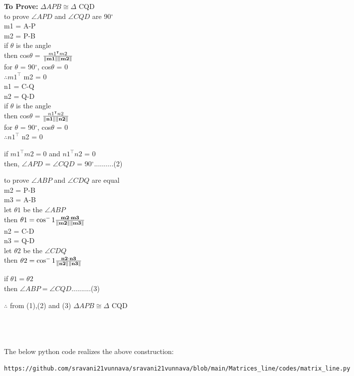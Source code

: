 \documentclass[10pt, a4paper]{article}
\let\vec\mathbf
\begin{document}
	\textbf{To Prove:}  $\Delta APB \cong \Delta$ CQD\\
	to prove $\angle {APD}$ and $\angle {CQD}$ are 90$^{\circ}$\\
	m1 = A-P\\
	m2 = P-B\\
	if $\theta$ is the angle\\
	then cos$\theta$ = $\frac{m1^\intercal m2}{\norm{\vec{m1}}\norm{\vec{m2}}}$\\
	for $\theta$ = 90$^{\circ}$, cos$\theta$ = 0\\
	$\therefore m1^\intercal$ m2 = 0\\
	n1 = C-Q\\
	n2 = Q-D\\
	if $\theta$ is the angle\\
	then cos$\theta$ = $\frac{n1^\intercal n2}{\norm{\vec{n1}}\norm{\vec{n2}}}$\\
	for $\theta$ = 90$^{\circ}$, cos$\theta$ = 0\\
	$\therefore n1^\intercal$ n2 = 0\\
	\begin{center}
	if 	$m1^\intercal m2 = 0$  and $n1^\intercal n2$ = 0\\
	then, $\angle {APD}$ = $\angle {CQD}$ = 90$^{\circ}$..........(2)\\
	\end{center}
	to prove $\angle {ABP}$ and $\angle {CDQ}$ are equal\\
	m2 = P-B\\
	m3 = A-B\\
	let $\theta1$ be the $\angle {ABP}$\\
	then $\theta1 = \cos^-1\frac{\vec{m2} \cdot \vec{m3}}{\norm{\vec{m2}}\norm{\vec{m3}}}$\\
	n2 = C-D\\
	n3 = Q-D\\
	let $\theta2$ be the $\angle {CDQ}$\\
	then $\theta2 = \cos^-1\frac{\vec{n2} \cdot \vec{n3}}{\norm{\vec{n2}}\norm{\vec{n3}}}$\\
	\begin{center}
	 		if $\theta1 = \theta2$\\
	 		then $\angle {ABP} = \angle {CQD}$..........(3)
	\end{center}
	\begin{center}
$\therefore$ from (1),(2) and (3)
$\Delta APB \cong \Delta$ CQD
	\end{center}
	\
\\
\
\\
\
\\
The below python code realizes the above construction:	
\begin{lstlisting}
https://github.com/sravani21vunnava/sravani21vunnava/blob/main/Matrices_line/codes/matrix_line.py
\end{lstlisting}
 
\end{document}
